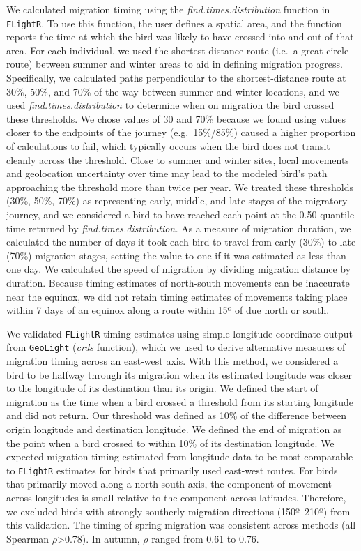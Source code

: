 \documentclass[a4paper, nobind]{templates/ociamthesis}
\begin{document}
We calculated migration timing using the \emph{find.times.distribution} function in \texttt{FLightR}. To use this function, the user defines a spatial area, and the function reports the time at which the bird was likely to have crossed into and out of that area. For each individual, we used the shortest-distance route (i.e.~a great circle route) between summer and winter areas to aid in defining migration progress. Specifically, we calculated paths perpendicular to the shortest-distance route at 30\%, 50\%, and 70\% of the way between summer and winter locations, and we used \emph{find.times.distribution} to determine when on migration the bird crossed these thresholds. We chose values of 30 and 70\% because we found using values closer to the endpoints of the journey (e.g.~15\%/85\%) caused a higher proportion of calculations to fail, which typically occurs when the bird does not transit cleanly across the threshold. Close to summer and winter sites, local movements and geolocation uncertainty over time may lead to the modeled bird's path approaching the threshold more than twice per year. We treated these thresholds (30\%, 50\%, 70\%) as representing early, middle, and late stages of the migratory journey, and we considered a bird to have reached each point at the 0.50 quantile time returned by \emph{find.times.distribution.} As a measure of migration duration, we calculated the number of days it took each bird to travel from early (30\%) to late (70\%) migration stages, setting the value to one if it was estimated as less than one day. We calculated the speed of migration by dividing migration distance by duration. Because timing estimates of north-south movements can be inaccurate near the equinox, we did not retain timing estimates of movements taking place within 7 days of an equinox along a route within 15º of due north or south.

We validated \texttt{FLightR} timing estimates using simple longitude coordinate output from \texttt{GeoLight} (\emph{crds} function), which we used to derive alternative measures of migration timing across an east-west axis. With this method, we considered a bird to be halfway through its migration when its estimated longitude was closer to the longitude of its destination than its origin. We defined the start of migration as the time when a bird crossed a threshold from its starting longitude and did not return. Our threshold was defined as 10\% of the difference between origin longitude and destination longitude. We defined the end of migration as the point when a bird crossed to within 10\% of its destination longitude. We expected migration timing estimated from longitude data to be most comparable to \texttt{FLightR} estimates for birds that primarily used east-west routes. For birds that primarily moved along a north-south axis, the component of movement across longitudes is small relative to the component across latitudes. Therefore, we excluded birds with strongly southerly migration directions (150º--210º) from this validation. The timing of spring migration was consistent across methods (all Spearman \(\rho\)\textgreater0.78). In autumn, \(\rho\) ranged from 0.61 to 0.76.
\end{document}
